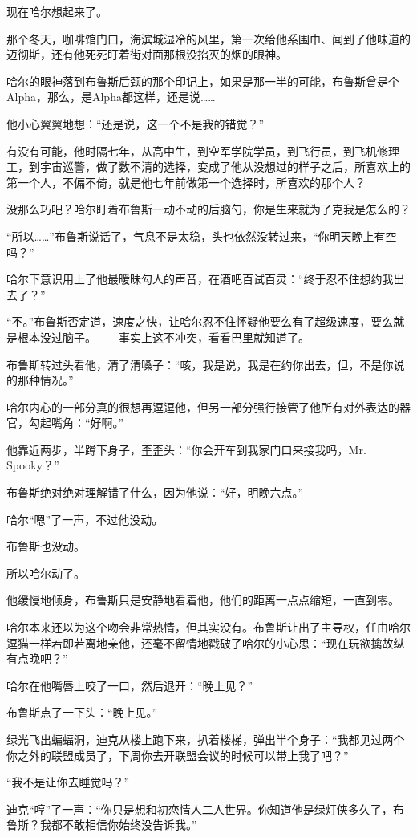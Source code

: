 \documentclass[../main]{subfiles}
\begin{document}
现在哈尔想起来了。

那个冬天，咖啡馆门口，海滨城湿冷的风里，第一次给他系围巾、闻到了他味道的迈彻斯，还有他死死盯着街对面那根没掐灭的烟的眼神。

哈尔的眼神落到布鲁斯后颈的那个印记上，如果是那一半的可能，布鲁斯曾是个Alpha，那么，是Alpha都这样，还是说……

他小心翼翼地想：“还是说，这一个不是我的错觉？”

有没有可能，他时隔七年，从高中生，到空军学院学员，到飞行员，到飞机修理工，到宇宙巡警，做了数不清的选择，变成了他从没想过的样子之后，所喜欢上的第一个人，不偏不倚，就是他七年前做第一个选择时，所喜欢的那个人？

没那么巧吧？哈尔盯着布鲁斯一动不动的后脑勺，你是生来就为了克我是怎么的？

“所以\ldots\ldots”布鲁斯说话了，气息不是太稳，头也依然没转过来，“你明天晚上有空吗？”

哈尔下意识用上了他最暧昧勾人的声音，在酒吧百试百灵：“终于忍不住想约我出去了？”

“不。”布鲁斯否定道，速度之快，让哈尔忍不住怀疑他要么有了超级速度，要么就是根本没过脑子。——事实上这不冲突，看看巴里就知道了。

布鲁斯转过头看他，清了清嗓子：“咳，我是说，我是在约你出去，但，不是你说的那种情况。”

哈尔内心的一部分真的很想再逗逗他，但另一部分强行接管了他所有对外表达的器官，勾起嘴角：“好啊。”

他靠近两步，半蹲下身子，歪歪头：“你会开车到我家门口来接我吗，Mr.
Spooky？”

布鲁斯绝对绝对理解错了什么，因为他说：“好，明晚六点。”

哈尔“嗯”了一声，不过他没动。

布鲁斯也没动。

所以哈尔动了。

他缓慢地倾身，布鲁斯只是安静地看着他，他们的距离一点点缩短，一直到零。

哈尔本来还以为这个吻会非常热情，但其实没有。布鲁斯让出了主导权，任由哈尔逗猫一样若即若离地亲他，还毫不留情地戳破了哈尔的小心思：“现在玩欲擒故纵有点晚吧？”

哈尔在他嘴唇上咬了一口，然后退开：“晚上见？”

布鲁斯点了一下头：“晚上见。”

绿光飞出蝙蝠洞，迪克从楼上跑下来，扒着楼梯，弹出半个身子：“我都见过两个你之外的联盟成员了，下周你去开联盟会议的时候可以带上我了吧？”

“我不是让你去睡觉吗？”

迪克“哼”了一声：“你只是想和初恋情人二人世界。你知道他是绿灯侠多久了，布鲁斯？我都不敢相信你始终没告诉我。”
\end{document}
